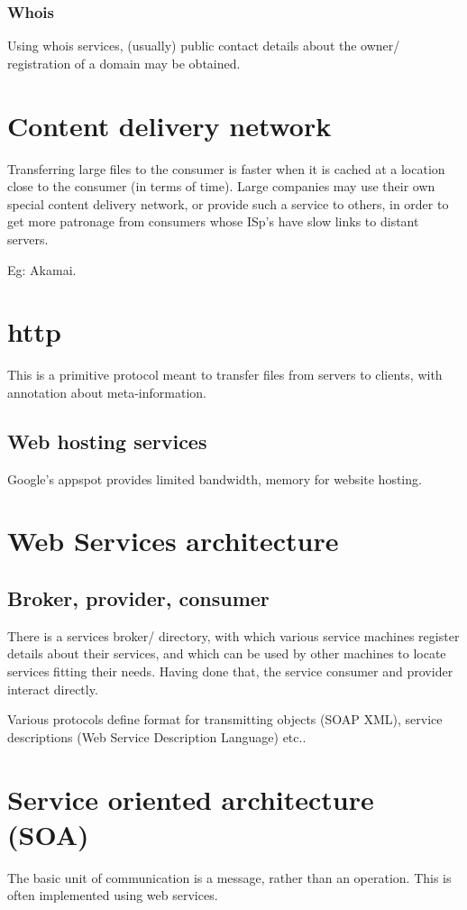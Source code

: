 \documentclass[oneside, article]{memoir}
\begin{document}
\subsection{Whois}
Using whois services, (usually) public contact details about the owner/ registration of a domain may be obtained.

\chapter{Content delivery network}
Transferring large files to the consumer is faster when it is cached at a location close to the consumer (in terms of time). Large companies may use their own special content delivery network, or provide such a service to others, in order to get more patronage from consumers whose ISp's have slow links to distant servers.

Eg: Akamai.

\chapter{http}
This is a primitive protocol meant to transfer files from servers to clients, with annotation about meta-information.

\section{Web hosting services}
Google's appspot provides limited bandwidth, memory for website hosting.

\chapter{Web Services architecture}
\section{Broker, provider, consumer}
There is a services broker/ directory, with which various service machines register details about their services, and which can be used by other machines to locate services fitting their needs. Having done that, the service consumer and provider interact directly.

Various protocols define format for transmitting objects (SOAP XML), service descriptions (Web Service Description Language) etc..

\chapter{Service oriented architecture (SOA)}
The basic unit of communication is a message, rather than an operation. This is often implemented using web services.

% 
% 
\end{document}
